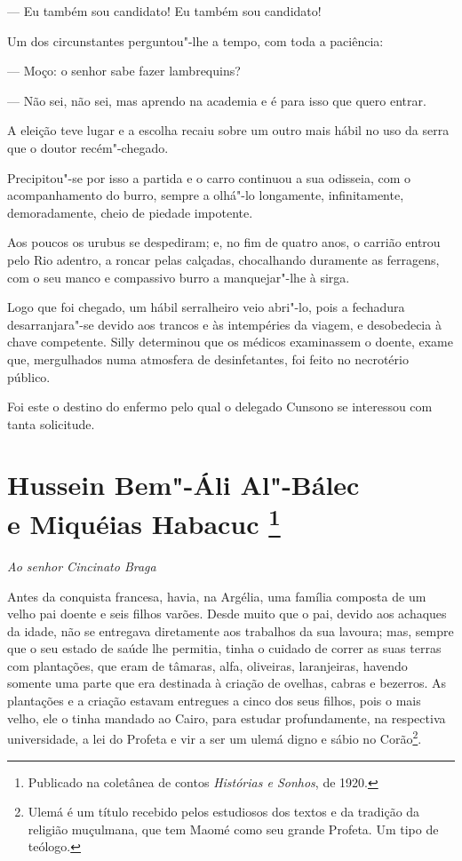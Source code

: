 --- Eu também sou candidato! Eu também sou candidato!

Um dos circunstantes perguntou"-lhe a tempo, com toda a paciência:

--- Moço: o senhor sabe fazer lambrequins?

--- Não sei, não sei, mas aprendo na academia e é para isso que quero
entrar.

A eleição teve lugar e a escolha recaiu sobre um outro mais hábil no uso
da serra que o doutor recém"-chegado.

Precipitou"-se por isso a partida e o carro continuou a sua odisseia, com
o acompanhamento do burro, sempre a olhá"-lo longamente, infinitamente,
demoradamente, cheio de piedade impotente.

Aos poucos os urubus se despediram; e, no fim de quatro anos, o carrião
entrou pelo Rio adentro, a roncar pelas calçadas, chocalhando duramente
as ferragens, com o seu manco e compassivo burro a manquejar"-lhe à
sirga.

Logo que foi chegado, um hábil serralheiro veio abri"-lo, pois a
fechadura desarranjara"-se devido aos trancos e às intempéries da viagem,
e desobedecia à chave competente. Silly determinou que os médicos
examinassem o doente, exame que, mergulhados numa atmosfera de
desinfetantes, foi feito no necrotério público.

Foi este o destino do enfermo pelo qual o delegado Cunsono se interessou
com tanta solicitude.


\chapter[Hussein Bem"-Áli Al"-Bálec e Miquéias Habacuc]{Hussein Bem"-Áli Al"-Bálec\\ e Miquéias Habacuc \footnote[*]{Publicado na coletânea de contos \emph{Histórias e Sonhos}, de 1920.}}

\hfill\emph{Ao senhor Cincinato Braga}\bigskip

\noindent{}Antes da conquista francesa, havia, na Argélia, uma família composta de
um velho pai doente e seis filhos varões. Desde muito que o pai, devido
aos achaques da idade, não se entregava diretamente aos trabalhos da sua
lavoura; mas, sempre que o seu estado de saúde lhe permitia, tinha o
cuidado de correr as suas terras com plantações, que eram de tâmaras,
alfa, oliveiras, laranjeiras, havendo somente uma parte que era
destinada à criação de ovelhas, cabras e bezerros. As plantações e a
criação estavam entregues a cinco dos seus filhos, pois o mais velho,
ele o tinha mandado ao Cairo, para estudar profundamente, na respectiva
universidade, a lei do Profeta e vir a ser um ulemá digno e sábio no
Corão\footnote{Ulemá é um título recebido pelos estudiosos dos textos e
  da tradição da religião muçulmana, que tem Maomé como seu grande
  Profeta. Um tipo de teólogo.}.

